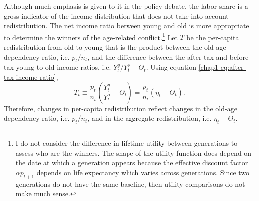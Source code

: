 Although much emphasis is given to it in the policy debate, the labor share is a gross indicator of the income distribution that does not take into account redistribution. The net income ratio between young and old is more appropriate to determine the winners of the age-related conflict.\footnote{I do not consider the difference in lifetime utility between generations to assess who are the winners. The shape of the utility function does depend on the date at which a generation appears because the effective discount factor $\alpha p_{t+1}$ depends on life expectancy which varies across generations. Since two generations do not have the same baseline, then utility comparisons do not make much sense.}
Let $T$ be the per-capita redistribution from old to young that is the product between the old-age dependency ratio, i.e. $p_t/n_t$, and the difference between the after-tax and before-tax young-to-old income ratios, i.e. $Y_t^y/Y_t^o - \Theta_t$. Using equation \eqref{chap1-eq:after-tax-income-ratio},
\begin{equation*}
    T_t \equiv \frac{p_t}{n_t}\left(\frac{Y_t^y}{Y_t^o} - \Theta_t\right) =  \frac{p_t}{n_t}\left(\eta_t - \Theta_t\right).
\end{equation*}
Therefore, changes in per-capita redistribution reflect changes in the old-age dependency ratio, i.e. $p_t/n_t$, and in the aggregate redistribution, i.e. $\eta_t - \Theta_t$.


